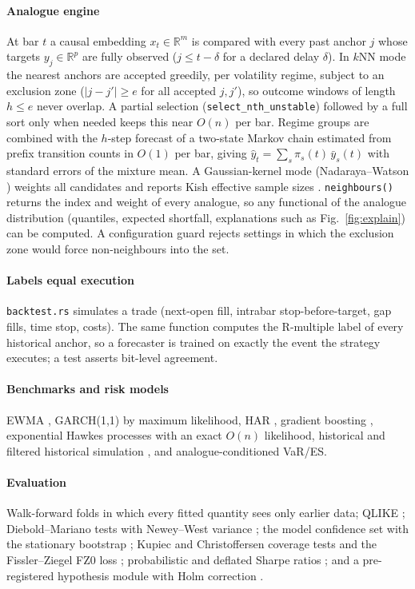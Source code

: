 \documentclass[preprint,12pt]{elsarticle}
\begin{document}
\paragraph{Analogue engine} At bar $t$ a causal embedding $x_t\in\mathbb{R}^m$ is compared with
every past anchor $j$ whose targets $y_j\in\mathbb{R}^p$ are fully observed ($j\le t-\delta$ for a
declared delay $\delta$). In $k$NN mode the nearest anchors are accepted greedily, per volatility
regime, subject to an exclusion zone ($|j-j'|\ge e$ for all accepted $j,j'$), so outcome windows
of length $h\le e$ never overlap. A partial selection (\texttt{select\_nth\_unstable}) followed by a
full sort only when needed keeps this near $O(n)$ per bar. Regime groups are combined with the
$h$-step forecast of a two-state Markov chain estimated from prefix transition counts in $O(1)$
per bar, giving $\hat y_t=\sum_s \pi_s(t)\,\bar y_s(t)$ with standard errors of the mixture mean.
A Gaussian-kernel mode (Nadaraya--Watson \cite{nadaraya1964,watson1964}) weights all candidates
and reports Kish effective sample sizes \cite{kish1965}. \texttt{neighbours()} returns the index
and weight of every analogue, so any functional of the analogue distribution (quantiles, expected
shortfall, explanations such as Fig.~\ref{fig:explain}) can be computed. A configuration guard
rejects settings in which the exclusion zone would force non-neighbours into the set.

\paragraph{Labels equal execution} \texttt{backtest.rs} simulates a trade (next-open fill,
intrabar stop-before-target, gap fills, time stop, costs). The same function computes the
R-multiple label of every historical anchor, so a forecaster is trained on exactly the event
the strategy executes; a test asserts bit-level agreement.

\paragraph{Benchmarks and risk models} EWMA \cite{riskmetrics1996}, GARCH(1,1) \cite{bollerslev1986}
by maximum likelihood, HAR \cite{corsi2009}, gradient boosting \cite{friedman2001,pedregosa2011},
exponential Hawkes processes \cite{hawkes1971} with an exact $O(n)$ likelihood, historical and
filtered historical simulation \cite{baroneadesi1999}, and analogue-conditioned VaR/ES.

\paragraph{Evaluation} Walk-forward folds in which every fitted quantity sees only earlier data;
QLIKE \cite{patton2011}; Diebold--Mariano tests \cite{diebold1995} with Newey--West variance
\cite{newey1987}; the model confidence set \cite{hansen2011} with the stationary bootstrap
\cite{politis1994}; Kupiec \cite{kupiec1995} and Christoffersen \cite{christoffersen1998} coverage
tests and the Fissler--Ziegel FZ0 loss \cite{fissler2016,patton2019}; probabilistic and deflated
Sharpe ratios \cite{bailey2012,bailey2014}; and a pre-registered hypothesis module with Holm
correction \cite{holm1979}.
\end{document}
